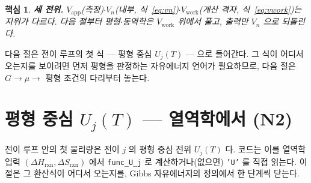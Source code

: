 \documentclass[11pt,a4paper]{article}
\newtheorem*{keybox}{핵심}
\newcommand{\app}{\mathrm{app}}
\newcommand{\rxn}{\mathrm{rxn}}
\newcommand{\work}{\mathrm{work}}
\newcommand{\code}[1]{\texttt{#1}}
\begin{document}
\begin{keybox}
\textbf{세 전위.} $V_\app$(측정)$\cdot$$V_n$(내부, 식~\eqref{eq:vn})$\cdot$$V_\work$(계산 격자, 식~\eqref{eq:vwork})는
지위가 다르다. 다음 절부터 평형$\cdot$동역학은 $V_\work$ 위에서 풀고, 출력만 $V_n$ 으로 되돌린다.
\end{keybox}

다음 절은 전이 루프의 첫 식 — 평형 중심 $U_j(T)$ — 으로 들어간다. 그 식이 어디서 오는지를 보이려면 먼저 평형을
판정하는 자유에너지 언어가 필요하므로, 다음 절은 $G\to\mu\to$ 평형 조건의 다리부터 놓는다.

\section{평형 중심 $U_j(T)$ — 열역학에서 (N2)}\label{sec:center}
전이 루프 안의 첫 물리량은 전이 $j$ 의 평형 중심 전위 $U_j(T)$ 다. 코드는 이를 열역학 입력 $(\Delta H_\rxn,\Delta S_\rxn)$
에서 \code{func\_U\_j} 로 계산하거나(없으면) \code{'U'} 를 직접 읽는다. 이 절은 그 환산식이 어디서 오는지를, Gibbs
자유에너지의 정의에서 한 단계씩 닫는다.
\end{document}
